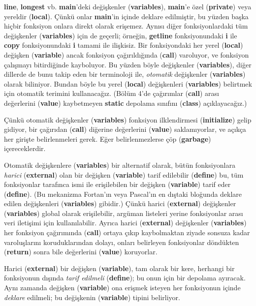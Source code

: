 \documentclass[a4paper,12pt,oneside]{book}
\begin{document}
\textbf{line}, \textbf{longest} vb. \textbf{main}'deki değişkenler (\textbf{variables}), \textbf{main}'e özel (\textbf{private}) veya yereldir (\textbf{local}). Çünkü onlar \textbf{main}'in içinde deklare edilmiştir, bu yüzden başka hiçbir fonksiyon onlara direkt olarak erişemez. Aynısı diğer fonksiyonlardaki tüm değişkenler (\textbf{variables}) için de geçerli; örneğin, \textbf{getline} fonksiyonundaki \textbf{i} ile \textbf{copy} fonksiyonundaki \textbf{i} tamami ile ilişkisiz. Bir fonksiyondaki her yerel (\textbf{local}) değişken (\textbf{variable}) ancak fonksiyon çağırıldığında (\textbf{call}) varoluyor, ve fonksiyon çalışmayı bitirdiğinde kayboluyor. Bu yüzden böyle değişkenler (\textbf{variables}), diğer dillerde de bunu takip eden bir terminoloji ile, \textit{otomatik} değişkenler (\textbf{variables}) olarak biliniyor. Bundan böyle bu yerel (\textbf{local}) değişkenleri (\textbf{variables}) belirtmek için otomatik terimini kullanacağız. (Bölüm 4'de çağırımlar (\textbf{call}) arası değerlerini (\textbf{value}) kaybetmeyen \textbf{static} depolama sınıfını (\textbf{class}) açıklayacağız.)
\par Çünkü otomatik değişkenler (\textbf{variables}) fonksiyon ilklendirmesi (\textbf{initialize}) gelip gidiyor, bir çağırıdan (\textbf{call}) diğerine değerlerini (\textbf{value}) saklamıyorlar, ve açıkça her girişte belirlenmeleri gerek. Eğer belirlenmezlerse çöp (\textbf{garbage}) içereceklerdir.
\par Otomatik değişkenlere (\textbf{variables}) bir alternatif olarak, bütün fonksiyonlara \textit{harici} (\textbf{external}) olan bir değişken (\textbf{variable}) tarif edilebilir (\textbf{define}) bu, tüm fonksiyonlar tarafınca ismi ile erişilebilen bir değişken (\textbf{variable}) tarif eder (\textbf{define}). (Bu mekanizma Fortan'ın veya Pascal'ın en dıştaki bloğunda deklare edilen değişkenleri (\textbf{variables}) gibidir.) Çünkü harici (\textbf{external}) değişkenler (\textbf{variables}) global olarak erişilebilir, argüman listeleri yerine fonksiyonlar arası veri iletişimi için kullanılabilir. Ayrıca harici (\textbf{external}) değişkenler (\textbf{variables}) her fonksiyon çağırımında (\textbf{call}) ortaya çıkıp kaybolmaktan ziyade sonsuza kadar varoluşlarını koruduklarından dolayı, onları belirleyen fonksiyonlar döndükten (\textbf{return}) sonra bile değerlerini (\textbf{value}) koruyorlar.
\par Harici (\textbf{external}) bir değişken (\textbf{variable}), tam olarak bir kere, herhangi bir fonksiyonun dışında  \textit{tarif edilmeli} (\textbf{define}); bu onun için bir depolama ayıracak. Aynı zamanda değişken (\textbf{variable}) ona erişmek isteyen her fonksiyonun içinde \textit{deklare} edilmeli; bu değişkenin (\textbf{variable}) tipini belirliyor.
\end{document}
